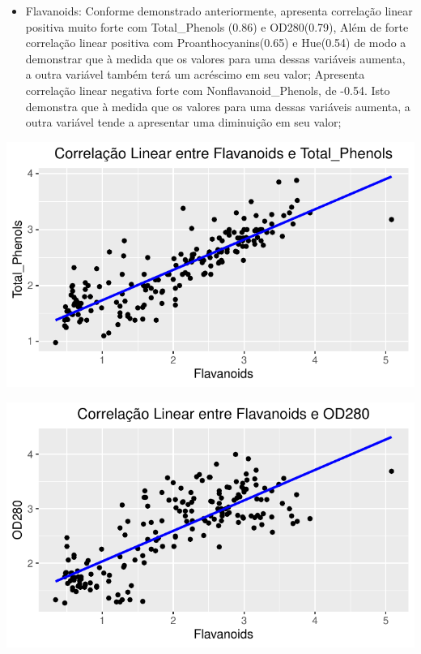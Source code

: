 \documentclass[
  letterpaper,
  DIV=11,
  numbers=noendperiod]{scrartcl}
\providecommand{\tightlist}{%
  \setlength{\itemsep}{0pt}\setlength{\parskip}{0pt}}\usepackage{longtable,booktabs,array}
\begin{document}
\begin{itemize}
\tightlist
\item
  Flavanoids: Conforme demonstrado anteriormente, apresenta correlação
  linear positiva muito forte com Total\_Phenols (0.86) e OD280(0.79),
  Além de forte correlação linear positiva com Proanthocyanins(0.65) e
  Hue(0.54) de modo a demonstrar que à medida que os valores para uma
  dessas variáveis aumenta, a outra variável também terá um acréscimo em
  seu valor; Apresenta correlação linear negativa forte com
  Nonflavanoid\_Phenols, de -0.54. Isto demonstra que à medida que os
  valores para uma dessas variáveis aumenta, a outra variável tende a
  apresentar uma diminuição em seu valor;
\end{itemize}

\begin{center}
\includegraphics{wines_analysis_files/figure-pdf/unnamed-chunk-11-1.pdf}
\end{center}

\begin{center}
\includegraphics{wines_analysis_files/figure-pdf/unnamed-chunk-11-2.pdf}
\end{center}
\end{document}
